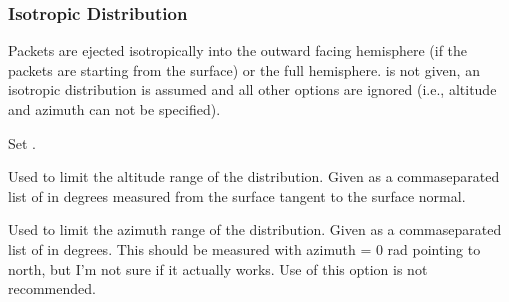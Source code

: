 \documentclass[letterpaper,10pt,english]{sphinxmanual}
\begin{document}
\subsubsection{Isotropic Distribution}
\label{\detokenize{nexoclom2/inputfiles:isotropic-distribution}}\label{\detokenize{nexoclom2/inputfiles:isotropicangulardist}}
\sphinxAtStartPar
Packets are ejected isotropically into the outward facing hemisphere (if the
packets are starting from the surface) or the full hemisphere.
 is not given, an isotropic distribution is assumed and
all other options are ignored (i.e., altitude and azimuth can not be specified).
\begin{description}
\sphinxAtStartPar
Set .

\sphinxAtStartPar
Used to limit the altitude range of the distribution. Given as a
comma\sphinxhyphen{}separated list of  in degrees measured from the
surface tangent to the surface normal.

\sphinxAtStartPar
Used to limit the azimuth range of the distribution. Given as a
comma\sphinxhyphen{}separated list of  in degrees. This should be measured with
azimuth = 0 rad pointing to north, but I’m not sure if it actually works.
Use of this option is not recommended.

\end{description}
\end{document}
